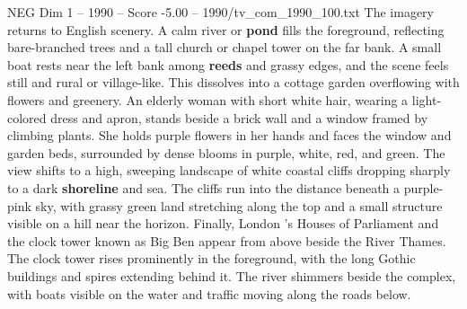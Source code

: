 \begin{textsample}{NEG Dim 1 – 1990 – Score -5.00 – 1990/tv\_com\_1990\_100.txt}
The imagery returns to English scenery.
A calm river or \textbf{pond} fills the foreground, reflecting bare-branched trees and a tall church or chapel tower on the far bank.
A small boat rests near the left bank among \textbf{reeds} and grassy edges, and the scene feels still and rural or village-like.
This dissolves into a cottage garden overflowing with flowers and greenery.
An elderly woman with short white hair, wearing a light-colored dress and apron, stands beside a brick wall and a window framed by climbing plants.
She holds purple flowers in her hands and faces the window and garden beds, surrounded by dense blooms in purple, white, red, and green.
The view shifts to a high, sweeping landscape of white coastal cliffs dropping sharply to a dark \textbf{shoreline} and sea.
The cliffs run into the distance beneath a purple-pink sky, with grassy green land stretching along the top and a small structure visible on a hill near the horizon.
Finally, London ’s Houses of Parliament and the clock tower known as Big Ben appear from above beside the River Thames.
The clock tower rises prominently in the foreground, with the long Gothic buildings and spires extending behind it.
The river shimmers beside the complex, with boats visible on the water and traffic moving along the roads below.

\end{textsample}
